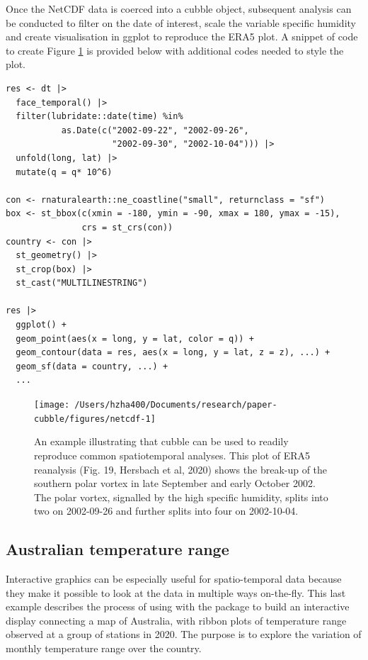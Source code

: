 \documentclass[
  shortnames]{jss}
\begin{document}
Once the NetCDF data is coerced into a cubble object, subsequent analysis can be conducted to filter on the date of interest, scale the variable specific humidity and create visualisation in ggplot to reproduce the ERA5 plot. A snippet of code to create Figure \ref{fig:netcdf} is provided below with additional codes needed to style the plot.

\begin{verbatim}
res <- dt |> 
  face_temporal() |> 
  filter(lubridate::date(time) %in% 
           as.Date(c("2002-09-22", "2002-09-26",
                     "2002-09-30", "2002-10-04"))) |>
  unfold(long, lat) |> 
  mutate(q = q* 10^6)

con <- rnaturalearth::ne_coastline("small", returnclass = "sf")
box <- st_bbox(c(xmin = -180, ymin = -90, xmax = 180, ymax = -15), 
               crs = st_crs(con)) 
country <- con |> 
  st_geometry() |> 
  st_crop(box) |> 
  st_cast("MULTILINESTRING")

res |> 
  ggplot() +
  geom_point(aes(x = long, y = lat, color = q)) + 
  geom_contour(data = res, aes(x = long, y = lat, z = z), ...) +
  geom_sf(data = country, ...) +
  ...
\end{verbatim}

\begin{CodeChunk}
\begin{figure}

{\centering \texttt{[image: /Users/hzha400/Documents/research/paper-cubble/figures/netcdf-1]} 

}

\caption[An example illustrating that cubble can be used to readily reproduce common spatiotemporal analyses]{An example illustrating that cubble can be used to readily reproduce common spatiotemporal analyses. This plot of ERA5 reanalysis (Fig. 19, Hersbach et al, 2020) shows the break-up of the southern polar vortex in late September and early October 2002. The polar vortex, signalled by the high specific humidity, splits into two on 2002-09-26 and further splits into four on 2002-10-04.}\label{fig:netcdf}
\end{figure}
\end{CodeChunk}

\hypertarget{australian-temperature-range}{%
\subsection{Australian temperature range}\label{australian-temperature-range}}

Interactive graphics can be especially useful for spatio-temporal data because they make it possible to look at the data in multiple ways on-the-fly. This last example describes the process of using
 with the  package to build an interactive display connecting a map of Australia, with ribbon plots of temperature range observed at a group of stations in 2020. The purpose is to explore the variation of monthly temperature range over the country.
\end{document}
